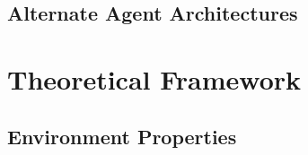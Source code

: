 \documentclass[]{final_report}
\begin{document}
\subsection{Alternate Agent Architectures}

\section{Theoretical Framework}
\subsection{Environment Properties}
\label{appendix:envprop}
\end{document}
